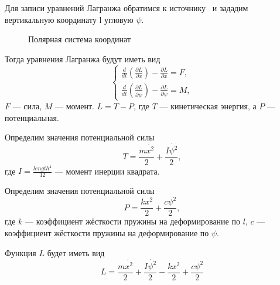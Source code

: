 \documentclass[a4paper,14pt]{extarticle}
\begin{document}
Для записи уравнений Лагранжа обратимся к источнику~\cite{itmo} и зададим вертикальную координату l угловую $\psi$.
\begin{figure}[!htbp]
	\caption{Полярная система координат}
	\label{Polar_coordinate_components}
\end{figure}

Тогда уравнения Лагранжа будут иметь вид~\cite{feodosiev}
\begin{equation}
	\begin{cases*}
	\frac{d}{dt} \left(\frac{\partial L}{\partial \dot{x}} \right) - \frac{\partial L}{\partial x} = F, \\
	\frac{d}{dt} \left(\frac{\partial L}{\partial \dot{\psi}} \right) - \frac{\partial L}{\partial \psi} = M,
	\end{cases*}
\label{lagrange}
\end{equation}
$F$ --- сила, $M$ --- момент. $L =  T - P$, где $T$ --- кинетическая энергия, а $P$ --- потенциальная.

\noindent Определим значения потенциальной силы
\begin{equation*}
	T = \frac{m \dot{x^2}}{2} + \frac{I \dot{\psi^2}}{2},
\end{equation*}
где $I = \frac{length^4}{12}$ --- момент инерции квадрата.

\noindent Определим значения потенциальной силы
\begin{equation*}
	P = \frac{k {x^2}}{2} +\frac{c {\psi^2}}{2},
\end{equation*}
где $k$ --- коэффициент жёсткости пружины на деформирование по $l$,  $c$ --- коэффициент жёсткости пружины на деформирование по $\psi$.

Функция $L$ будет иметь вид
\begin{equation*}
	L = \frac{m \dot{x^2}}{2} + \frac{I \dot{\psi^2}}{2} - \frac{k {x^2}}{2} +\frac{c {\psi^2}}{2}
\end{equation*}
\end{document}
